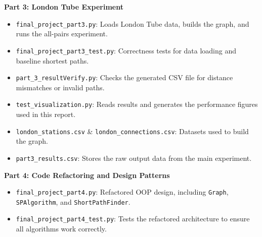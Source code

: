 \documentclass[letterpaper]{article}
\theoremstyle{plain}
\theoremstyle{definition}
\theoremstyle{remark}
\newcounter{experiment}
\begin{document}
\noindent\textbf{Part 3: London Tube Experiment}
\begin{itemize}
    \item \texttt{final\_project\_part3.py}: Loads London Tube data, builds the graph, and runs the all-pairs experiment.
    \item \texttt{final\_project\_part3\_test.py}: Correctness tests for data loading and baseline shortest paths.
    \item \texttt{part\_3\_resultVerify.py}: Checks the generated CSV file for distance mismatches or invalid paths.
    \item \texttt{test\_visualization.py}: Reads results and generates the performance figures used in this report.
    \item \texttt{london\_stations.csv} \& \texttt{london\_connections.csv}: Datasets used to build the graph.
    \item \texttt{part3\_results.csv}: Stores the raw output data from the main experiment.
\end{itemize}

\noindent\textbf{Part 4: Code Refactoring and Design Patterns}
\begin{itemize}
    \item \texttt{final\_project\_part4.py}: Refactored OOP design, including \texttt{Graph}, \texttt{SPAlgorithm}, and \texttt{ShortPathFinder}.
    \item \texttt{final\_project\_part4\_test.py}: Tests the refactored architecture to ensure all algorithms work correctly.
\end{itemize}
\end{document}
